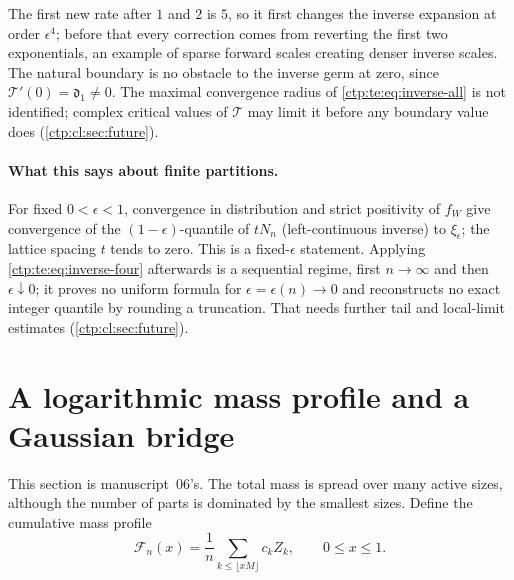 \documentclass[11pt,a4paper]{article}
\numberwithin{equation}{section}
\theoremstyle{definition}
\theoremstyle{remark}
\newcommand{\sd}{\mathfrak d}
\begin{document}
The first new rate after $1$ and $2$ is $5$, so it first changes the inverse
expansion at order $\epsilon^4$; before that every correction comes from
reverting the first two exponentials, an example of sparse forward scales
creating denser inverse scales. The natural boundary is no obstacle to the
inverse germ at zero, since $\mathcal T'(0)=\sd_1\ne0$. The maximal
convergence radius of \eqref{ctp:te:eq:inverse-all} is not identified;
complex critical values of $\mathcal T$ may limit it before any boundary
value does (\cref{ctp:cl:sec:future}).

\paragraph{What this says about finite partitions.} For fixed
$0<\epsilon<1$, convergence in distribution and strict positivity of $f_W$
give convergence of the $(1-\epsilon)$-quantile of $tN_n$ (left-continuous
inverse) to $\xi_\epsilon$; the lattice spacing $t$ tends to zero. This is a
fixed-$\epsilon$ statement. Applying \eqref{ctp:te:eq:inverse-four}
afterwards is a sequential regime, first $n\to\infty$ and then
$\epsilon\downarrow0$; it proves no uniform formula for
$\epsilon=\epsilon(n)\to0$ and reconstructs no exact integer quantile by
rounding a truncation. That needs further tail and local-limit estimates
(\cref{ctp:cl:sec:future}).

\section{A logarithmic mass profile and a Gaussian bridge}
\label{ctp:cl:sec:bridge}

This section is manuscript~06's. The total mass is spread over many active
sizes, although the number of parts is dominated by the smallest sizes.
Define the cumulative mass profile
\begin{equation}\label{ctp:cl:eq:profile}
 \mathcal F_n(x)=\frac1n\sum_{k\le\lfloor xM\rfloor}c_kZ_k,\qquad0\le x\le1.
\end{equation}
\end{document}
